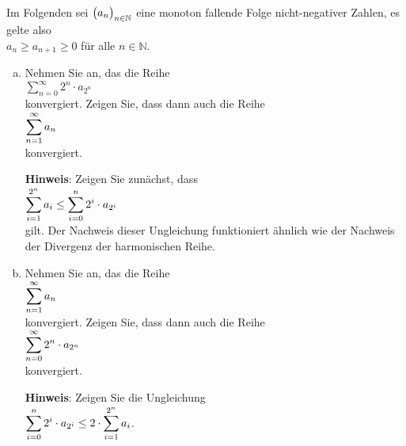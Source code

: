 \exercise
Im Folgenden sei $\bigl(a_n\bigr)_{n\in\mathbb{N}}$ eine monoton fallende Folge nicht-negativer Zahlen, es gelte also
\\
\hspace*{1.3cm}
$a_n \geq a_{n+1} \geq 0$ \quad f\"ur alle $n \in \mathbb{N}$.
\begin{enumerate}[(a)]
\item Nehmen Sie an, das die Reihe
      \\[0.2cm]
      \hspace*{1.3cm}
      $\sum\limits_{n=0}^\infty 2^n \cdot a_{2^n}$ 
      \\[0.2cm]
      konvergiert.  Zeigen Sie, dass dann auch die Reihe
      \\[0.2cm]
      \hspace*{1.3cm}
      $\displaystyle\sum\limits_{n=1}^\infty a_n$
      \\[0.2cm]
      konvergiert.

      \textbf{Hinweis}:  Zeigen Sie zun\"achst, dass
      \\[0.2cm]
      \hspace*{1.3cm}
      $\displaystyle\sum\limits_{i=1}^{2^n} a_i \leq \sum\limits_{i=0}^n 2^i \cdot a_{2^i}$       
      \\[0.2cm]
      gilt.  Der Nachweis dieser Ungleichung funktioniert \"ahnlich wie der Nachweis der Divergenz der
      harmonischen Reihe.
\item Nehmen Sie an, das die Reihe
      \\[0.2cm]
      \hspace*{1.3cm}
      $\displaystyle\sum\limits_{n=1}^\infty a_n$
      \\[0.2cm]
      konvergiert.  Zeigen Sie, dass dann auch die Reihe
      \\[0.2cm]
      \hspace*{1.3cm}
      $\displaystyle\sum\limits_{n=0}^\infty 2^n \cdot a_{2^n}$ 
      \\[0.2cm]
      konvergiert.

      \textbf{Hinweis}:  Zeigen Sie die Ungleichung
      \\[0.2cm]
      \hspace*{1.3cm}
      $\displaystyle\sum\limits_{i=0}^n 2^i \cdot a_{2^i} \leq 2 \cdot \sum\limits_{i=1}^{2^n} a_i $.
      

\end{enumerate}
